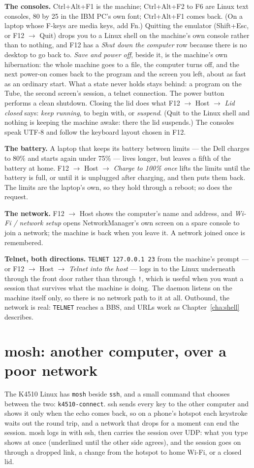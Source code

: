 \textbf{The consoles.} Ctrl+Alt+F1 is the machine; Ctrl+Alt+F2 to F6 are
Linux text consoles, 80 by 25 in the IBM PC's own font;
Ctrl+Alt+F1 comes back. (On a laptop whose F-keys are
media keys, add Fn.) Quitting the emulator (Shift+Esc, or F12
$\rightarrow$ Quit) drops you to a Linux shell on the machine's own
console rather than to nothing, and F12 has a \emph{Shut down the
computer} row because there is no desktop to go back to. \emph{Save and
power off}, beside it, is the machine's own hibernation: the whole
machine goes to a file, the computer turns off, and the next power-on
comes back to the program and the screen you left, about as fast as an
ordinary start. What a state never holds stays behind: a program on the
Tube, the second screen's session, a telnet connection. The power
button performs a clean shutdown. Closing the lid does what F12
$\rightarrow$ Host $\rightarrow$ \emph{Lid closed} says: \emph{keep
running}, to begin with, or \emph{suspend}. (Quit to the Linux shell and
nothing is keeping the machine awake: there the lid suspends.) The consoles speak UTF-8 and follow
the keyboard layout chosen in F12.

\textbf{The battery.} A laptop that keeps its battery between limits
--- the Dell charges to 80\% and starts again under 75\% --- lives
longer, but leaves a fifth of the battery at home. F12 $\rightarrow$
Host $\rightarrow$ \emph{Charge to 100\% once} lifts the limits until
the battery is full, or until it is unplugged after charging, and then
puts them back. The limits are the laptop's own, so they hold through a
reboot; so does the request.

\textbf{The network.} F12 $\rightarrow$ Host shows the computer's name
and address, and \emph{Wi-Fi / network setup} opens NetworkManager's
own screen on a spare console to join a network; the machine is back
when you leave it. A network joined once is remembered.

\textbf{Telnet, both directions.} \verb|TELNET 127.0.0.1 23| from the
machine's prompt --- or F12 $\rightarrow$ Host $\rightarrow$ \emph{Telnet
into the host} --- logs in to the Linux underneath through the front
door rather than through \verb|!|, which is useful when you want a
session that survives what the machine is doing. The daemon listens on
the machine itself only, so there is no network path to it at all.
Outbound, the network is real: \verb|TELNET| reaches a BBS, and URLs
work as Chapter~\ref{cha:shell} describes.

\section{mosh: another computer, over a poor network}\label{sec:mosh}
The K4510 Linux has \verb|mosh| beside \verb|ssh|, and a small
command that chooses between the two: \verb|k4510-connect|. ssh sends every key to
the other computer and shows it only when the echo comes back, so on a
phone's hotspot each keystroke waits out the round trip, and a network
that drops for a moment can end the session. mosh logs in with ssh, then
carries the session over UDP: what you type shows at once (underlined
until the other side agrees), and the session goes on through a dropped
link, a change from the hotspot to home Wi-Fi, or a closed lid.

